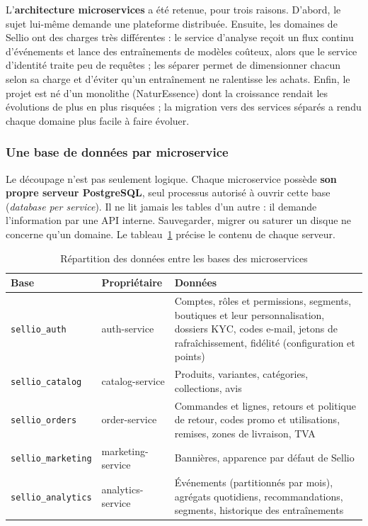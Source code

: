 L'\textbf{architecture microservices} a été retenue, pour trois raisons. D'abord, le sujet lui-même demande une plateforme distribuée. Ensuite, les domaines de Sellio ont des charges très différentes : le service d'analyse reçoit un flux continu d'événements et lance des entraînements de modèles coûteux, alors que le service d'identité traite peu de requêtes ; les séparer permet de dimensionner chacun selon sa charge et d'éviter qu'un entraînement ne ralentisse les achats. Enfin, le projet est né d'un monolithe (NaturEssence) dont la croissance rendait les évolutions de plus en plus risquées ; la migration vers des services séparés a rendu chaque domaine plus facile à faire évoluer.


\subsubsection{Une base de données par microservice}
Le découpage n'est pas seulement logique. Chaque microservice possède \textbf{son propre serveur PostgreSQL}, seul processus autorisé à ouvrir cette base (\textit{database per service}). Il ne lit jamais les tables d'un autre : il demande l'information par une API interne. Sauvegarder, migrer ou saturer un disque ne concerne qu'un domaine. Le tableau~\ref{tab:bases} précise le contenu de chaque serveur.
\begin{table}[H]
\centering
\renewcommand{\arraystretch}{1.3}
\small
\begin{tabular}{|p{3.1cm}|p{2.3cm}|p{9.2cm}|}
\hline
\textbf{Base} & \textbf{Propriétaire} & \textbf{Données} \\
\hline
\texttt{sellio\_auth} & auth-service & Comptes, rôles et permissions, segments, boutiques et leur personnalisation, dossiers KYC, codes e-mail, jetons de rafraîchissement, fidélité (configuration et points) \\
\hline
\texttt{sellio\_catalog} & catalog-service & Produits, variantes, catégories, collections, avis \\
\hline
\texttt{sellio\_orders} & order-service & Commandes et lignes, retours et politique de retour, codes promo et utilisations, remises, zones de livraison, TVA \\
\hline
\texttt{sellio\_marketing} & marketing-service & Bannières, apparence par défaut de Sellio \\
\hline
\texttt{sellio\_analytics} & analytics-service & Événements (partitionnés par mois), agrégats quotidiens, recommandations, segments, historique des entraînements \\
\hline
\end{tabular}
\caption{Répartition des données entre les bases des microservices}
\label{tab:bases}
\end{table}

